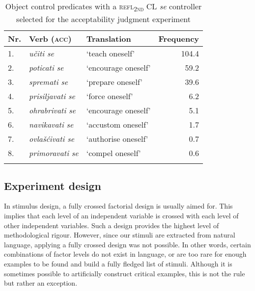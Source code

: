 \begin{table}
\caption{Object control predicates with a \textsc{refl\textsubscript{2nd}} CL \textit{se} controller selected for the acceptability judgment experiment\label{T16.5}}
\begin{tabular}{l@{~}llr}
\lsptoprule
Nr.& Verb (\textsc{acc}) &Translation& Frequency\\\midrule
1. &\textit{učiti se}& ‘teach oneself’& 104.4\\
2. &\textit{poticati se}& ‘encourage oneself’& 59.2\\
3. &\textit{spremati se}& ‘prepare oneself’ &39.6\\
4. &\textit{prisiljavati se}& ‘force oneself’ &6.2\\
5. &\textit{ohrabrivati se}& ‘encourage oneself’& 5.1\\
6. &\textit{navikavati se}& ‘accustom oneself’& 1.7\\
7. &\textit{ovlašćivati se}& ‘authorise oneself’& 0.7\\
8. &\textit{primoravati se}& ‘compel oneself’ &0.6\\
\lspbottomrule
\end{tabular}
\end{table}

\subsection{Experiment design}\label{Design}

In stimulus design, a fully crossed factorial design is usually aimed for. This implies that each level of an independent variable is crossed with each level of other independent variables. Such a design provides the highest level of methodological rigour. However, since our stimuli are extracted from natural language, applying a fully crossed design was not possible. In other words, certain combinations of factor levels do not exist in language, or are too rare for enough examples to be found and build a fully fledged list of stimuli. Although it is sometimes possible to artificially construct critical examples, this is not the rule but rather an exception. 

